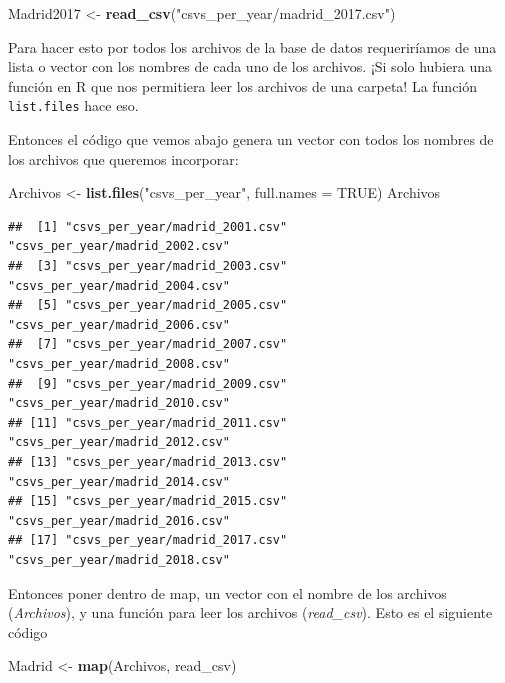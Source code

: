 \documentclass[]{book}
\newenvironment{Shaded}{\begin{snugshade}}{\end{snugshade}}
\newcommand{\DataTypeTok}[1]{\textcolor[rgb]{0.13,0.29,0.53}{#1}}
\newcommand{\KeywordTok}[1]{\textcolor[rgb]{0.13,0.29,0.53}{\textbf{#1}}}
\newcommand{\NormalTok}[1]{#1}
\newcommand{\OtherTok}[1]{\textcolor[rgb]{0.56,0.35,0.01}{#1}}
\newcommand{\StringTok}[1]{\textcolor[rgb]{0.31,0.60,0.02}{#1}}
\begin{document}
\begin{Shaded}
\begin{Highlighting}[]
\NormalTok{Madrid2017 <-}\StringTok{ }\KeywordTok{read_csv}\NormalTok{(}\StringTok{"csvs_per_year/madrid_2017.csv"}\NormalTok{)}
\end{Highlighting}
\end{Shaded}

Para hacer esto por todos los archivos de la base de datos requeriríamos
de una lista o vector con los nombres de cada uno de los archivos. ¡Si
solo hubiera una función en R que nos permitiera leer los archivos de
una carpeta! La función \texttt{list.files} hace eso.

Entonces el código que vemos abajo genera un vector con todos los
nombres de los archivos que queremos incorporar:

\begin{Shaded}
\begin{Highlighting}[]
\NormalTok{Archivos <-}\StringTok{ }\KeywordTok{list.files}\NormalTok{(}\StringTok{"csvs_per_year"}\NormalTok{, }\DataTypeTok{full.names =} \OtherTok{TRUE}\NormalTok{)}
\NormalTok{Archivos}
\end{Highlighting}
\end{Shaded}

\begin{verbatim}
##  [1] "csvs_per_year/madrid_2001.csv" "csvs_per_year/madrid_2002.csv"
##  [3] "csvs_per_year/madrid_2003.csv" "csvs_per_year/madrid_2004.csv"
##  [5] "csvs_per_year/madrid_2005.csv" "csvs_per_year/madrid_2006.csv"
##  [7] "csvs_per_year/madrid_2007.csv" "csvs_per_year/madrid_2008.csv"
##  [9] "csvs_per_year/madrid_2009.csv" "csvs_per_year/madrid_2010.csv"
## [11] "csvs_per_year/madrid_2011.csv" "csvs_per_year/madrid_2012.csv"
## [13] "csvs_per_year/madrid_2013.csv" "csvs_per_year/madrid_2014.csv"
## [15] "csvs_per_year/madrid_2015.csv" "csvs_per_year/madrid_2016.csv"
## [17] "csvs_per_year/madrid_2017.csv" "csvs_per_year/madrid_2018.csv"
\end{verbatim}

Entonces poner dentro de map, un vector con el nombre de los archivos
(\emph{Archivos}), y una función para leer los archivos
(\emph{read\_csv}). Esto es el siguiente código

\begin{Shaded}
\begin{Highlighting}[]
\NormalTok{Madrid <-}\StringTok{ }\KeywordTok{map}\NormalTok{(Archivos, read_csv)}
\end{Highlighting}
\end{Shaded}
\end{document}
